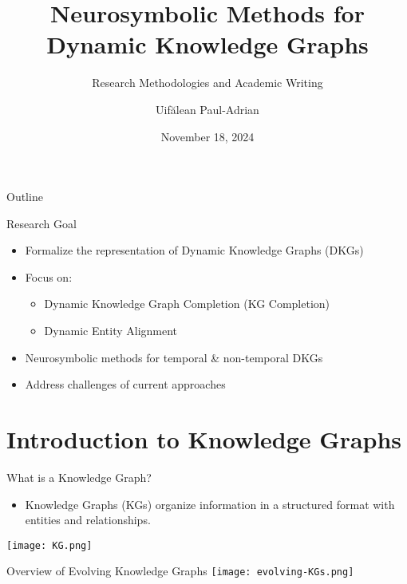 \documentclass{beamer}
\title{Neurosymbolic Methods for Dynamic Knowledge Graphs}
\subtitle{Research Methodologies and Academic Writing}
\author{Uif\u{a}lean Paul-Adrian}
\institute{Babe\c{s}-Bolyai University}
\date{November 18, 2024}
\begin{document}
    \begin{frame}
        \titlepage
    \end{frame}

    \begin{frame}{Outline}
        \tableofcontents
    \end{frame}

    \begin{frame}{Research Goal}
        \begin{itemize}
            \item Formalize the representation of Dynamic Knowledge Graphs (DKGs)
            \item Focus on:
            \begin{itemize}
                \item Dynamic Knowledge Graph Completion (KG Completion)
                \item Dynamic Entity Alignment
            \end{itemize}
            \item Neurosymbolic methods for temporal \& non-temporal DKGs
            \item Address challenges of current approaches
        \end{itemize}
    \end{frame}

    
    \section{Introduction to Knowledge Graphs}
    
    \begin{frame}{What is a Knowledge Graph?}
        \begin{itemize}
            \item Knowledge Graphs (KGs) organize information in a structured format with entities and relationships.
        \end{itemize}
        
        \texttt{[image: KG.png]}
    \end{frame}

    \begin{frame}{Overview of Evolving Knowledge Graphs}
        \texttt{[image: evolving-KGs.png]}
    \end{frame}
\end{document}
